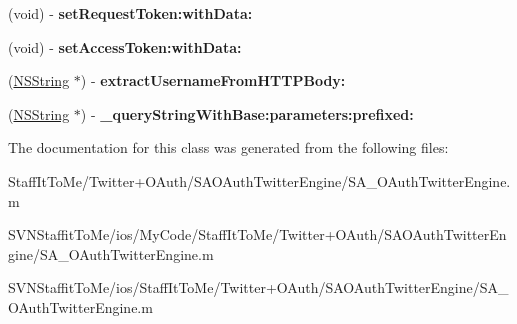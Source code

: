 \begin{DoxyCompactItemize}
\item 
\hypertarget{interface_s_a___o_auth_twitter_engine_07private_08_abf015228461b234cbf2f2cf3c0247542}{
(void) -\/ {\bfseries set\-Request\-Token\-:with\-Data\-:}}
\label{interface_s_a___o_auth_twitter_engine_07private_08_abf015228461b234cbf2f2cf3c0247542}

\item 
\hypertarget{interface_s_a___o_auth_twitter_engine_07private_08_a1a0e8f39dff6ba8e287180749f1628af}{
(void) -\/ {\bfseries set\-Access\-Token\-:with\-Data\-:}}
\label{interface_s_a___o_auth_twitter_engine_07private_08_a1a0e8f39dff6ba8e287180749f1628af}

\item 
\hypertarget{interface_s_a___o_auth_twitter_engine_07private_08_a576a2074d5edfa01fe9d7cadcf347d19}{
(\hyperlink{class_n_s_string}{\-N\-S\-String} $\ast$) -\/ {\bfseries extract\-Username\-From\-H\-T\-T\-P\-Body\-:}}
\label{interface_s_a___o_auth_twitter_engine_07private_08_a576a2074d5edfa01fe9d7cadcf347d19}

\item 
\hypertarget{interface_s_a___o_auth_twitter_engine_07private_08_a28b22d1d6615b9fe78ae76a226277c68}{
(\hyperlink{class_n_s_string}{\-N\-S\-String} $\ast$) -\/ {\bfseries \-\_\-query\-String\-With\-Base\-:parameters\-:prefixed\-:}}
\label{interface_s_a___o_auth_twitter_engine_07private_08_a28b22d1d6615b9fe78ae76a226277c68}

\end{DoxyCompactItemize}


\-The documentation for this class was generated from the following files\-:\begin{DoxyCompactItemize}
\item 
\-Staff\-It\-To\-Me/\-Twitter+\-O\-Auth/\-S\-A\-O\-Auth\-Twitter\-Engine/\-S\-A\-\_\-\-O\-Auth\-Twitter\-Engine.\-m\item 
\-S\-V\-N\-Staffit\-To\-Me/ios/\-My\-Code/\-Staff\-It\-To\-Me/\-Twitter+\-O\-Auth/\-S\-A\-O\-Auth\-Twitter\-Engine/\-S\-A\-\_\-\-O\-Auth\-Twitter\-Engine.\-m\item 
\-S\-V\-N\-Staffit\-To\-Me/ios/\-Staff\-It\-To\-Me/\-Twitter+\-O\-Auth/\-S\-A\-O\-Auth\-Twitter\-Engine/\-S\-A\-\_\-\-O\-Auth\-Twitter\-Engine.\-m\end{DoxyCompactItemize}
